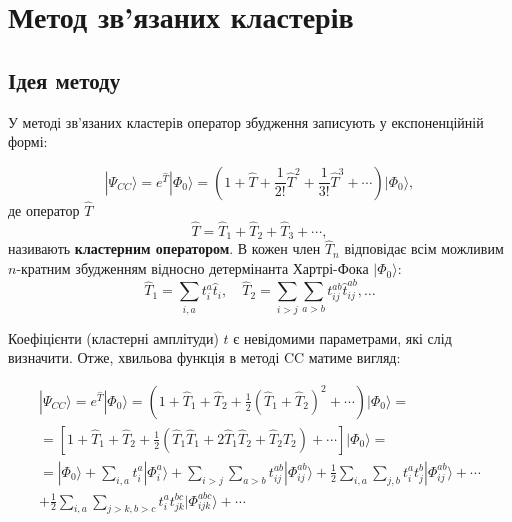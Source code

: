 

\section{Метод зв’язаних кластерів}


\subsection{Ідея методу}

У методі зв'язаних кластерів оператор збудження записують у експоненційній формі:

\begin{equation}\label{eq:CC}
| \Psi_{CC} \rangle = e^{\hat{T}} | \Phi_0 \rangle = (1 + \hat{T} + \frac{1}{2!} \hat{T}^2 + \frac{1}{3!} \hat{T}^3 + \cdots) | \Phi_0 \rangle,
\end{equation}
 де оператор $\hat{T}$
\begin{equation}
\hat{T} = \hat{T}_1 + \hat{T}_2 + \hat{T}_3 + \cdots,
\end{equation}
називають \textbf{кластерним оператором}. В кожен член $\hat{T}_n$ відповідає всім можливим $n$-кратним збудженням відносно детермінанта Хартрі-Фока $|\Phi_0 \rangle$:
\begin{equation*}
\hat{T}_1 = \sum_{i,a} t_i^a \hat{t}_i, \quad \hat{T}_2 = \sum_{i>j} \sum_{a>b} t_{ij}^{ab} \hat{t}_{ij}^{ab}, \ldots
\end{equation*}

Коефіцієнти (кластерні амплітуди) $t$ є невідомими параметрами, які слід визначити. Отже, хвильова функція в методі CC матиме вигляд:


\begin{multline*}
| \Psi_{CC} \rangle = e^{\hat{T}} | \Phi_0 \rangle = (1 + \hat{T}_1 + \hat{T}_2 + \frac{1}{2} (\hat{T}_1 + \hat{T}_2)^2 + \cdots) | \Phi_0 \rangle = \\
= \left[ 1 + \hat{T}_1 + \hat{T}_2 + \frac{1}{2} (\hat{T}_1 \hat{T}_1 + 2\hat{T}_1 \hat{T}_2 + \hat{T}_2 \hat{T}_2) + \cdots \right] | \Phi_0 \rangle = \\
= | \Phi_0 \rangle + \sum_{i,a} t_i^a | \Phi_i^a \rangle + \sum_{i>j} \sum_{a>b} t_{ij}^{ab} | \Phi_{ij}^{ab} \rangle + \frac{1}{2} \sum_{i,a} \sum_{j,b} t_i^a t_j^b | \Phi_{ij}^{ab} \rangle +  \cdots \\
+ \frac{1}{2} \sum_{i,a} \sum_{j>k,b>c} t_i^a t_{jk}^{bc} | \Phi_{ijk}^{abc} \rangle + \cdots
\end{multline*}

